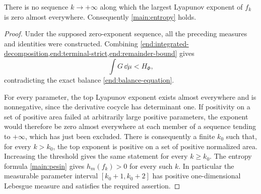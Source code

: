 \begin{theorem}
\label{end:contradiction}
There is no sequence $k\to+\infty$ along which the largest Lyapunov
exponent of $f_k$ is zero almost everywhere.  Consequently
\cref{main:entropy} holds.
\end{theorem}

\begin{proof}
Under the supposed zero-exponent sequence, all the preceding measures
and identities were constructed.  Combining
\cref{end:integrated-decomposition,end:terminal-strict,end:remainder-bound}
gives
\[
 \int G\,\dd\mu<H_\Phi,
\]
contradicting the exact balance \cref{end:balance-equation}.

For every parameter, the top Lyapunov exponent exists almost everywhere
and is nonnegative, since the derivative cocycle has determinant one.
If positivity on a set of positive area failed at arbitrarily large
positive parameters, the exponent would therefore be zero almost
everywhere at each member of a sequence tending to $+\infty$, which has
just been excluded.  There is consequently a finite $k_0$ such that,
for every $k>k_0$, the top exponent is positive on a set of positive
normalized area.  Increasing the threshold gives the same statement
for every $k\ge k_0$.  The entropy formula \cref{main:pesin} gives
$h_m(f_k)>0$ for every such $k$.  In particular the measurable parameter
interval $[k_0+1,k_0+2]$ has positive one-dimensional Lebesgue measure
and satisfies the required assertion.
\end{proof}

